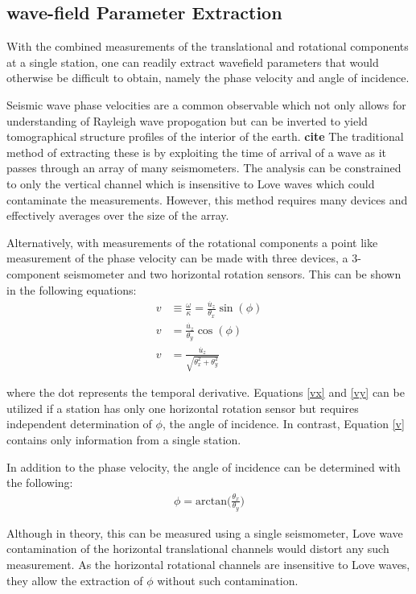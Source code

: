 \documentclass [12pt, proquest]{uwthesis}[2019]
\begin{document}
\subsection{wave-field Parameter Extraction}

With the combined measurements of the translational and rotational components at a single station, one can readily extract wavefield parameters that would otherwise be difficult to obtain, namely the phase velocity and angle of incidence. 

Seismic wave phase velocities are a common observable which not only allows for understanding of Rayleigh wave propogation but can be inverted to yield tomographical structure profiles of the interior of the earth. \textbf{cite} The traditional method of extracting these is by exploiting the time of arrival of a wave as it passes through an array of many seismometers. The analysis can be constrained to only the vertical channel which is insensitive to Love waves which could contaminate the measurements. However, this method requires many devices and effectively averages over the size of the array.

Alternatively, with measurements of the rotational components a point like measurement of the phase velocity can be made with three devices, a 3-component seismometer and two horizontal rotation sensors. This can be shown in the following equations:
\begin{align} 
v&\equiv\frac{\omega}{\kappa} = \frac{\dot{u_z}}{\theta_x}\sin(\phi) \label{vx} \\
v&=\frac{\dot{u_z}}{\theta_y}\cos(\phi)\label{vy} \\
v&=\frac{\dot{u_z}}{\sqrt{\theta_x^2+\theta_y^2}} \label{v}
\end{align}

where the dot represents the temporal derivative. Equations \ref{vx} and \ref{vy} can be utilized if a station has only one horizontal rotation sensor but requires independent determination of $\phi$, the angle of incidence. In contrast, Equation \ref{v} contains only information from a single station.

In addition to the phase velocity, the angle of incidence can be determined with the following:
\begin{align}
\phi=\text{arctan}\bigg(\frac{\theta_x}{\theta_y}\bigg)
\end{align}

Although in theory, this can be measured using a single seismometer, Love wave contamination of the horizontal translational channels would distort any such measurement. As the horizontal rotational channels are insensitive to Love waves, they allow the extraction of $\phi$ without such contamination.  
\end{document}
